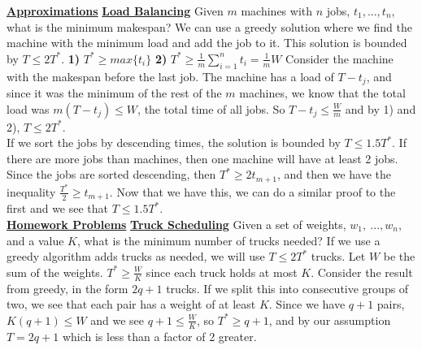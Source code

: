 \documentclass[10pt]{article}
\begin{document}
\begin{multicols*}{3}
\noindent \Large{\underline{\textbf{Approximations}}} \newline
\normalsize
\noindent \underline{\textbf{Load Balancing}} \newline
Given $m$ machines with $n$ jobs, $t_1, ..., t_n$, what is the minimum makespan? \newline
We can use a greedy solution where we find the machine with the minimum load and add the job to it. \newline
This solution is bounded by $T \leq 2 T^*$. \newline
\textbf{1)} $T^* \geq max\{t_i\}$ \newline
\textbf{2)} $T^* \geq \frac{1}{m} \sum\limits_{i=1}^n t_i = \frac{1}{m} W$ \newline 
Consider the machine with the makespan before the last job. The machine has a load of $T - t_j$, and since it was the minimum of the rest of the $m$ machines, we know that the total load was $m (T - t_j) \leq W$, the total time of all jobs. So $T - t_j \leq \frac{W}{m}$ and by 1) and 2), $T \leq 2 T^*$. \newline \\
If we sort the jobs by descending times, the solution is bounded by $T \leq 1.5 T^*$. \newline
If there are more jobs than machines, then one machine will have at least 2 jobs. Since the jobs are sorted descending, then $T^* \geq 2 t_{m+1}$, and then we have the inequality $\frac{T^*}{2} \geq t_{m+1}$. Now that we have this, we can do a similar proof to the first and we see that $T \leq 1.5 T^*$. \newline \\
\noindent \Large{\underline{\textbf{Homework Problems}}} \newline
\normalsize
\noindent \underline{\textbf{Truck Scheduling}} \newline
Given a set of weights, $w_1,\ ..., w_n$, and a value $K$, what is the minimum number of trucks needed? If we use a greedy algorithm adds trucks as needed, we will use $T \leq 2 T^*$ trucks. Let $W$ be the sum of the weights. $T^* \geq \frac{W}{K}$ since each truck holds at most $K$. Consider the result from greedy, in the form $2q + 1$ trucks. If we split this into consecutive groups of two, we see that each pair has a weight of at least $K$. Since we have $q+1$ pairs, $K (q + 1)\leq W$ and we see $q + 1 \leq \frac{W}{K}$, so $T^* \geq q + 1$, and by our assumption $T = 2q + 1$ which is less than a factor of 2 greater. \newline \\

\end{multicols*}
\end{document}
